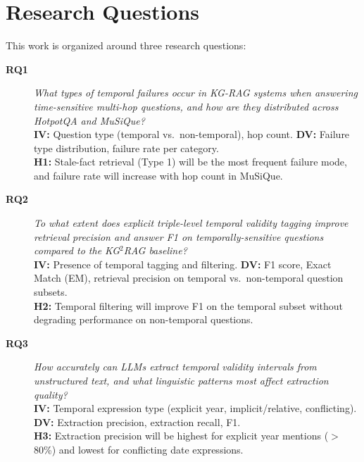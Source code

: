 \documentclass[11pt]{article}
\begin{document}
\section{Research Questions}

This work is organized around three research questions:

\begin{description}
  \item[\textbf{RQ1}] \textit{What types of temporal failures occur in
    KG-RAG systems when answering time-sensitive multi-hop questions,
    and how are they distributed across HotpotQA and MuSiQue?}\\
    \textbf{IV:} Question type (temporal vs.\ non-temporal), hop count.
    \textbf{DV:} Failure type distribution, failure rate per category.\\
    \textbf{H1:} Stale-fact retrieval (Type 1) will be the most frequent
    failure mode, and failure rate will increase with hop count in MuSiQue.

  \item[\textbf{RQ2}] \textit{To what extent does explicit triple-level
    temporal validity tagging improve retrieval precision and answer F1
    on temporally-sensitive questions compared to the KG$^2$RAG baseline?}\\
    \textbf{IV:} Presence of temporal tagging and filtering.
    \textbf{DV:} F1 score, Exact Match (EM), retrieval precision on
    temporal vs.\ non-temporal question subsets.\\
    \textbf{H2:} Temporal filtering will improve F1 on the temporal subset
    without degrading performance on non-temporal questions.

  \item[\textbf{RQ3}] \textit{How accurately can LLMs extract temporal
    validity intervals from unstructured text, and what linguistic patterns
    most affect extraction quality?}\\
    \textbf{IV:} Temporal expression type (explicit year, implicit/relative,
    conflicting).
    \textbf{DV:} Extraction precision, extraction recall, F1.\\
    \textbf{H3:} Extraction precision will be highest for explicit year
    mentions ($>$80\%) and lowest for conflicting date expressions.
\end{description}

\end{document}

